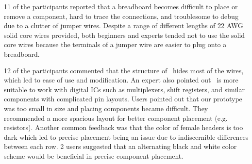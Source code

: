 
11 of the participants reported that a breadboard becomes difficult to place or remove a component, hard to trace the connections, and troublesome to debug due to a clutter of jumper wires. Despite a range of different lengths of 22 AWG solid core wires provided, both beginners and experts tended not to use the solid core wires because the terminals of a jumper wire are easier to plug onto a breadboard.


12 of the participants commented that the structure of \papertitle\ hides most of the wires, which led to ease of use and modification. An expert also pointed out \papertitle\ is more suitable to work with digital ICs such as multiplexers, shift registers, and similar components with complicated pin layouts.
Users pointed out that our prototype was too small in size and placing components became difficult. They recommended a more spacious layout for better component placement (e.g. resistors).
Another common feedback was that the color of female headers is too dark which led to precise placement being an issue due to indiscernible differences between each row. 2 users suggested that an alternating black and white color scheme would be beneficial in precise component placement.


